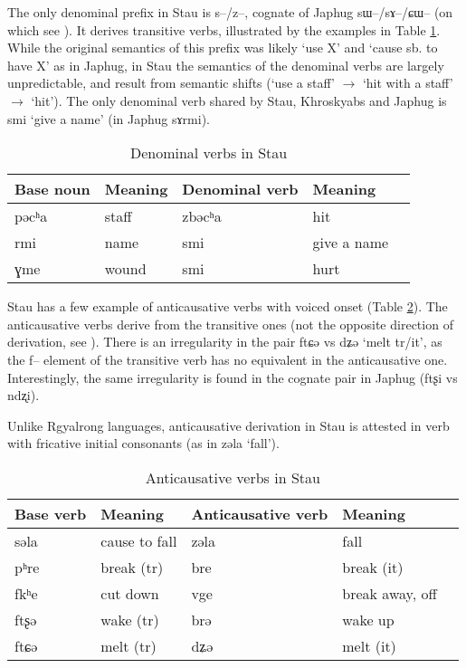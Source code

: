\documentclass[oneside,a4paper,11pt]{article}
\newcommand{\ipa}[1]{{\phon #1}} %
\begin{document}
The only denominal prefix in Stau is \ipa{s--/z--}, cognate of Japhug \ipa{sɯ--/sɤ--/ɕɯ--} (on which see \citealt[14-17]{jacques14antipassive}). It derives transitive verbs, illustrated by the examples in Table \ref{tab:denominal}. While the original semantics of this prefix was likely `use X' and `cause sb. to have X' as in Japhug, in Stau the semantics of the denominal verbs are largely unpredictable, and result from semantic shifts (`use a staff' $\rightarrow$ `hit with a staff' $\rightarrow$  `hit'). The only denominal verb shared by Stau, Khroskyabs and Japhug is \ipa{smi} `give a name' (in Japhug \ipa{sɤrmi}).
 
 \begin{table}[H]
 \caption{Denominal verbs in Stau} \label{tab:denominal} \centering 
\begin{tabular}{lllll}
\toprule
Base noun & Meaning & Denominal verb & Meaning \\
\midrule
\ipa{pəcʰa} & staff&\ipa{zbəcʰa} & hit \\
\ipa{rmi} &name &\ipa{smi} &give a name \\
\ipa{ɣme} &wound &\ipa{smi} & hurt \\
\bottomrule
\end{tabular}
\end{table}
 
 
 Stau has a few example of anticausative verbs with voiced onset (Table \ref{tab:anticausative}). The anticausative verbs derive from the transitive ones (not the opposite direction of derivation, see \citealt{jacques12demotion}). There is an irregularity in the pair \ipa{ftɕə} vs \ipa{dʑə} `melt tr/it', as the \ipa{f--} element of the transitive verb has no equivalent in the anticausative one. Interestingly, the same irregularity is found in the cognate pair in Japhug (\ipa{ftʂi} vs \ipa{ndʐi}).
 
Unlike Rgyalrong languages, anticausative derivation in Stau is attested in verb with fricative initial consonants (as in \ipa{zəla}  `fall').
 
  \begin{table}[H]
 \caption{Anticausative verbs in Stau} \label{tab:anticausative} \centering 
\begin{tabular}{lllll}
\toprule
Base verb & Meaning & Anticausative verb & Meaning \\
\midrule
 \ipa{səla} &cause to fall & \ipa{zəla}  & fall \\
\ipa{pʰre}   &break (tr) &\ipa{bre}   & break (it) \\
  \ipa{fkʰe} & cut down & \ipa{vge} & break away, off \\
\ipa{ftʂə}& wake (tr) & \ipa{brə}& wake up\\
\ipa{ftɕə} &melt (tr) &\ipa{dʑə} &melt (it)\\
 \bottomrule
\end{tabular}
\end{table}
 
\end{document}
